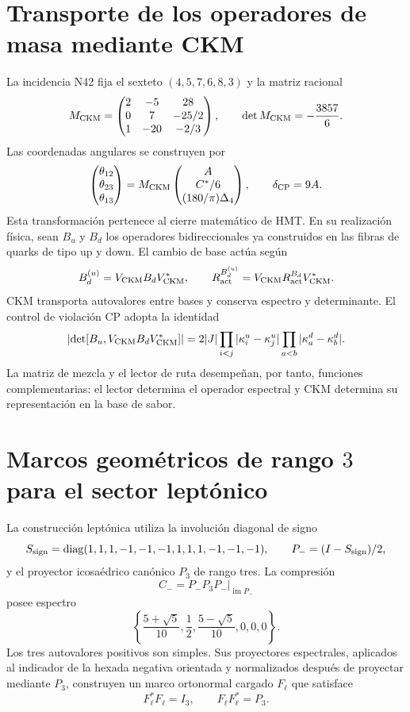 \section{Transporte de los operadores de masa mediante CKM}
\label{sec:transporte-ckm-operadores-rev11}

La incidencia N42 fija el sexteto \((4,5,7,6,8,3)\) y la matriz racional
\[
 M_{\rm CKM}=
 \begin{pmatrix}
 2&-5&28\\
 0&7&-25/2\\
 1&-20&-2/3
 \end{pmatrix},
 \qquad \det M_{\rm CKM}=-\frac{3857}{6}.
\]
Las coordenadas angulares se construyen por
\[
 \begin{pmatrix}\theta_{12}\\\theta_{23}\\\theta_{13}\end{pmatrix}
 =M_{\rm CKM}
 \begin{pmatrix}A\\ C^*/6\\ (180/\pi)\Delta_4\end{pmatrix},
 \qquad \delta_{\rm CP}=9A.
\]
Esta transformación pertenece al cierre matemático de HMT. En su realización
física, sean \(B_u\) y \(B_d\) los operadores bidireccionales ya construidos en las
fibras de quarks de tipo up y down. El cambio de base actúa según
\begin{equation}
 B_d^{(u)}=V_{\rm CKM}B_dV_{\rm CKM}^*,
 \qquad
 R_{\rm act}^{B_d^{(u)}}
 =V_{\rm CKM}R_{\rm act}^{B_d}V_{\rm CKM}^*.
 \label{eq:transporte-ckm-kappa-rev11}
\end{equation}
CKM transporta autovalores entre bases y conserva espectro y determinante.
El control de violación CP adopta la identidad
\[
 \left|\det[B_u,V_{\rm CKM}B_dV_{\rm CKM}^*]\right|
 =2|J|\prod_{i<j}|\kappa_i^u-\kappa_j^u|
       \prod_{a<b}|\kappa_a^d-\kappa_b^d|.
\]
La matriz de mezcla y el lector de ruta desempeñan, por tanto, funciones
complementarias: el lector determina el operador espectral y CKM determina
su representación en la base de sabor.

\section{Marcos geométricos de rango \(3\) para el sector leptónico}
\label{sec:frames-pmns-rev11}

La construcción leptónica utiliza la involución diagonal de signo
\[
 S_{\rm sign}=\operatorname{diag}(1,1,1,-1,-1,-1,1,1,1,-1,-1,-1),
 \qquad P_-=(I-S_{\rm sign})/2,
\]
y el proyector icosaédrico canónico \(P_3\) de rango tres. La compresión
\[
 C_-=P_-P_3P_-\big|_{\operatorname{im}P_-}
\]
posee espectro
\[
 \left\{\frac{5+\sqrt5}{10},\frac12,
 \frac{5-\sqrt5}{10},0,0,0\right\}.
\]
Los tres autovalores positivos son simples. Sus proyectores espectrales,
aplicados al indicador de la hexada negativa orientada y normalizados después
de proyectar mediante \(P_3\), construyen un marco ortonormal cargado
\(F_\ell\) que satisface
\[
 F_\ell^*F_\ell=I_3,
 \qquad F_\ell F_\ell^*=P_3.
\]


